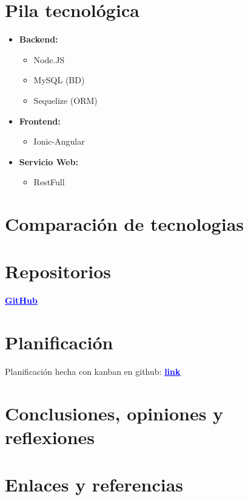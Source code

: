 \documentclass{article}
\begin{document}
\section{Pila tecnológica}
\begin{itemize}
\item \textbf{Backend:}
\begin{itemize}
\item Node.JS
\item MySQL (BD)
\item Sequelize (ORM)
\end{itemize}
\item \textbf{Frontend:}
    \begin{itemize}
    \item Ionic-Angular
    \end{itemize}
    \item \textbf{Servicio Web:}
    \begin{itemize}
    \item RestFull
    \end{itemize}
\end{itemize}
\section{Comparación de tecnologias}
\section{Repositorios}
\begin{center}
    \href{https://github.com/Nestorbd/Full-Stack-Proyect}{\textbf{\textcolor{blue}{\underline{GitHub}}}}
\end{center}
\section{Planificación}
\quad Planificación hecha con kanban en github: \href{https://github.com/Nestorbd/Full-Stack-Proyect/projects/1}{\textbf{\textcolor{blue}{\underline{link}}}}

\section{Conclusiones, opiniones y reflexiones}
\section{Enlaces y referencias}
\end{document}
